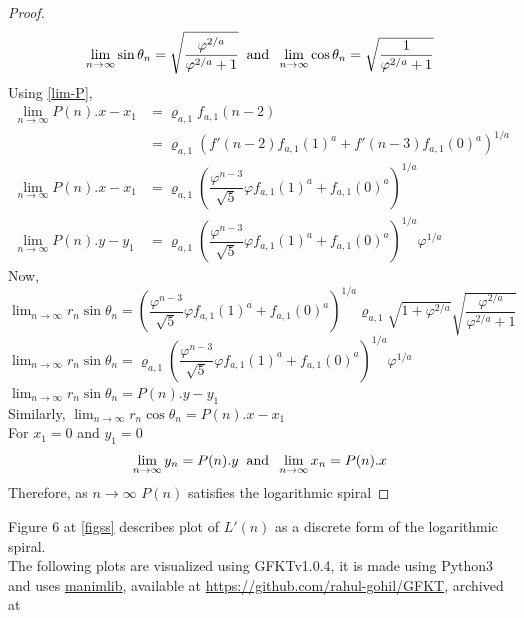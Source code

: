 \documentclass[preprint,12pt]{elsarticle}
\begin{document}
\begin{proof}
	$$\lim_{n \to \infty}\sin\theta_n = \sqrt{\dfrac{\varphi^{2/a}}{\varphi^{2/a}+1}}\hspace{2mm}\text{and}\hspace{2mm}\lim_{n \to \infty}\cos\theta_n = \sqrt{\dfrac{1}{\varphi^{2/a}+1}}$$
	Using \ref{lim-P},\\
	\begin{align*}
		\lim_{n \to \infty}P(n).x-x_1   & = \varrho_{a,1}f_{a,1}(n-2)                                                                                      \\
		                                & =\varrho_{a,1}\left(f'(n-2)f_{a,1}(1)^a+f'(n-3)f_{a,1}(0)^a\right)^{1/a}                                         \\
		\lim_{n \to \infty}P(n).x-x_1   & =\varrho_{a,1}\left(\dfrac{\varphi^{n-3}}{\sqrt{5}}\varphi f_{a,1}(1)^a+f_{a,1}(0)^a\right)^{1/a}                \\
		\lim_{n \to \infty}P(n).y - y_1 & = \varrho_{a,1}\left(\dfrac{\varphi^{n-3}}{\sqrt{5}}\varphi f_{a,1}(1)^a+f_{a,1}(0)^a\right)^{1/a} \varphi^{1/a} 
	\end{align*}
	Now,\\
	$\displaystyle\lim_{n \to \infty}r_n\sin\theta_n=\left(\dfrac{\varphi^{n-3}}{\sqrt{5}}\varphi f_{a,1}(1)^a+f_{a,1}(0)^a\right)^{1/a}\varrho_{a,1}\sqrt{1+\varphi^{2/a}}\sqrt{\dfrac{\varphi^{2/a}}{\varphi^{2/a}+1}} $\\
	$\displaystyle\lim_{n \to \infty}r_n\sin\theta_n=\varrho_{a,1}\left(\dfrac{\varphi^{n-3}}{\sqrt{5}}\varphi f_{a,1}(1)^a+f_{a,1}(0)^a\right)^{1/a} \varphi^{1/a}$\\
	$\displaystyle\lim_{n \to \infty}r_n\sin\theta_n=P(n).y-y_1$\\
	Similarly, $\displaystyle\lim_{n \to \infty}r_n\cos\theta_n=P(n).x-x_1$\\
	For $x_1 = 0$ and $y_1 = 0$
	$$\lim_{n \to \infty}y_n = P(n).y\hspace{2mm}\text{and}\hspace{2mm}\lim_{n \to \infty}x_n = P(n).x$$
	Therefore, as $n \to \infty$ $P(n)$ satisfies the logarithmic spiral
\end{proof}
Figure 6 at \ref{figss} describes plot of $L'(n)$ as a discrete form of the logarithmic spiral.\\
The following plots are visualized using GFKTv1.0.4\cite{rahulgohil_2020}, it is made using Python3 and uses \href{https://github.com/3b1b/manim}{manimlib}, available at \href{https://github.com/rahul-gohil/GFKT}{https://github.com/rahul-gohil/GFKT}, archived at 
\end{document}
